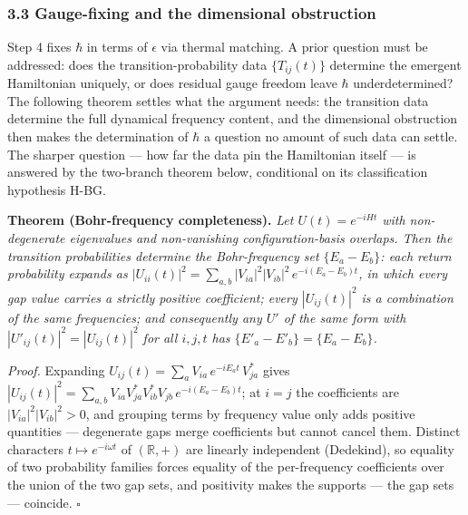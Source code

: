 \documentclass[
]{article}
\begin{document}
\hypertarget{gauge-fixing-and-the-dimensional-obstruction}{%
\subsubsection{3.3 Gauge-fixing and the dimensional
obstruction}\label{gauge-fixing-and-the-dimensional-obstruction}}

Step 4 fixes \(\hbar\) in terms of \(\epsilon\) via thermal matching. A
prior question must be addressed: does the transition-probability data
\(\{T_{ij}(t)\}\) determine the emergent Hamiltonian uniquely, or does
residual gauge freedom leave \(\hbar\) underdetermined? The following
theorem settles what the argument needs: the transition data determine
the full dynamical frequency content, and the dimensional obstruction
then makes the determination of \(\hbar\) a question no amount of such
data can settle. The sharper question --- how far the data pin the
Hamiltonian itself --- is answered by the two-branch theorem below,
conditional on its classification hypothesis H-BG.

\textbf{Theorem (Bohr-frequency completeness).} \emph{Let
\(U(t) = e^{-iHt}\) with non-degenerate eigenvalues and non-vanishing
configuration-basis overlaps. Then the transition probabilities
determine the Bohr-frequency set \(\{E_a - E_b\}\): each return
probability expands as
\(|U_{ii}(t)|^2 = \sum_{a,b} |V_{ia}|^2 |V_{ib}|^2\, e^{-i(E_a - E_b)t}\),
in which every gap value carries a strictly positive coefficient; every
\(|U_{ij}(t)|^2\) is a combination of the same frequencies; and
consequently any \(U'\) of the same form with
\(|U'_{ij}(t)|^2 = |U_{ij}(t)|^2\) for all \(i, j, t\) has
\(\{E'_a - E'_b\} = \{E_a - E_b\}\).}

\emph{Proof.} Expanding
\(U_{ij}(t) = \sum_a V_{ia}\, e^{-iE_a t}\, V_{ja}^*\) gives
\(|U_{ij}(t)|^2 = \sum_{a,b} V_{ia} V_{ja}^* V_{ib}^* V_{jb}\, e^{-i(E_a - E_b)t}\);
at \(i = j\) the coefficients are \(|V_{ia}|^2 |V_{ib}|^2 > 0\), and
grouping terms by frequency value only adds positive quantities ---
degenerate gaps merge coefficients but cannot cancel them. Distinct
characters \(t \mapsto e^{-i\omega t}\) of \((\mathbb{R}, +)\) are
linearly independent (Dedekind), so equality of two probability families
forces equality of the per-frequency coefficients over the union of the
two gap sets, and positivity makes the supports --- the gap sets ---
coincide. \(\square\)
\end{document}
